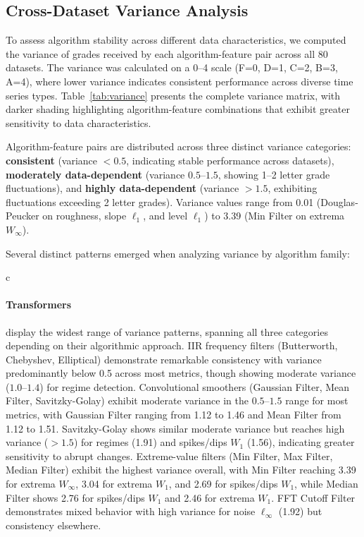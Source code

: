 \subsection{Cross-Dataset Variance Analysis}

To assess algorithm stability across different data characteristics, we computed the variance of grades received by each algorithm-feature pair across all 80 datasets. The variance was calculated on a 0--4 scale (F=0, D=1, C=2, B=3, A=4), where lower variance indicates consistent performance across diverse time series types. Table~\ref{tab:variance} presents the complete variance matrix, with darker shading highlighting algorithm-feature combinations that exhibit greater sensitivity to data characteristics.

Algorithm-feature pairs are distributed across three distinct variance categories: \textbf{consistent} (variance $<0.5$, indicating stable performance across datasets), \textbf{moderately data-dependent} (variance $0.5$--$1.5$, showing 1--2 letter grade fluctuations), and \textbf{highly data-dependent} (variance $>1.5$, exhibiting fluctuations exceeding 2 letter grades). Variance values range from 0.01 (Douglas-Peucker on roughness, slope $\ell_1$, and level $\ell_1$) to 3.39 (Min Filter on extrema $W_\infty$).

Several distinct patterns emerged when analyzing variance by algorithm family:

      c
\paragraph{Transformers} display the widest range of variance patterns, spanning all three categories depending on their algorithmic approach. IIR frequency filters (Butterworth, Chebyshev, Elliptical) demonstrate remarkable consistency with variance predominantly below 0.5 across most metrics, though showing moderate variance ($1.0$--$1.4$) for regime detection. Convolutional smoothers (Gaussian Filter, Mean Filter, Savitzky-Golay) exhibit moderate variance in the $0.5$--$1.5$ range for most metrics, with Gaussian Filter ranging from 1.12 to 1.46 and Mean Filter from 1.12 to 1.51. Savitzky-Golay shows similar moderate variance but reaches high variance ($>1.5$) for regimes (1.91) and spikes/dips $W_1$ (1.56), indicating greater sensitivity to abrupt changes. Extreme-value filters (Min Filter, Max Filter, Median Filter) exhibit the highest variance overall, with Min Filter reaching 3.39 for extrema $W_\infty$, 3.04 for extrema $W_1$, and 2.69 for spikes/dips $W_1$, while Median Filter shows 2.76 for spikes/dips $W_1$ and 2.46 for extrema $W_1$. FFT Cutoff Filter demonstrates mixed behavior with high variance for noise $\ell_\infty$ (1.92) but consistency elsewhere.

